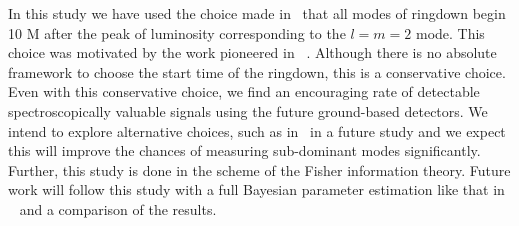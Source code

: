In this study we have used the choice made in~\cite{2014PhRvD..90l4032L} that all modes of ringdown begin 10 M after the peak of luminosity corresponding to the $l=m=2$ mode. This choice was motivated by the work pioneered in ~\cite{2012PhRvL.109n1102K}. Although there is no absolute framework to choose the start time of the ringdown, this is a conservative choice. Even with this conservative choice, we find an encouraging rate of detectable spectroscopically valuable signals using the future ground-based detectors. We intend to explore alternative choices, such as in~\cite{2007PhRvD..76f4034B} in a future study and we expect this will improve the chances of measuring sub-dominant modes significantly. Further, this study is done in the scheme of the Fisher information theory. Future work will follow this study with a full Bayesian parameter estimation like that in ~\cite{PhysRevD.85.124056} and a comparison of the results. 




